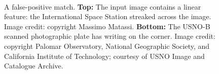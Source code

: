 \documentclass[letterpaper]{ut-thesis}%
\newcommand{\captionpart}[1]{\textbf{#1}}
\begin{document}
\graphicspath{{figs-techreport/}}

\begin{figure}[htp]
\begin{center}
\setlength{\fboxsep}{0.5pt}
\setlength{\fboxrule}{0.25pt}
%
\\
%
\end{center}
\caption{A false-positive match.  \captionpart{Top:} The input image
contains a linear feature: the International Space Station streaked
across the image.  Image credit: copyright Massimo Matassi.
\captionpart{Bottom:} The USNO-B scanned photographic plate has
writing on the corner.  Image credit: copyright Palomar Observatory,
National Geographic Society, and California Institute of Technology;
courtesy of USNO Image and Catalogue Archive.
\label{fig:falseposA}}
\end{figure}
\end{document}
